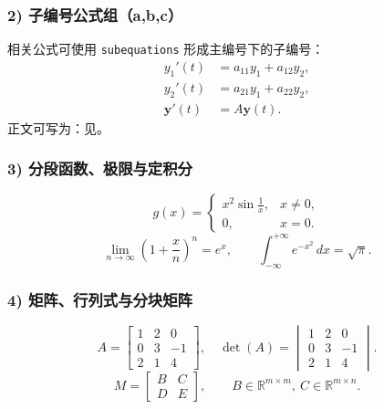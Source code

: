 \subsubsection*{2) 子编号公式组（a,b,c）}
相关公式可使用 \verb|subequations| 形成主编号下的子编号：
\begin{subequations}\label{eq:usage-ode}
  \begin{align}
    y_1'(t) &= a_{11}y_1+a_{12}y_2, \label{eq:usage-ode-a}\\
    y_2'(t) &= a_{21}y_1+a_{22}y_2, \label{eq:usage-ode-b}\\
    \bm{y}'(t) &= A\bm{y}(t). \label{eq:usage-ode-c}
  \end{align}
\end{subequations}
正文可写为：见。

\subsubsection*{3) 分段函数、极限与定积分}
\begin{equation}\label{eq:usage-cases}
  g(x)=
  \begin{cases}
    x^2\sin\frac{1}{x}, & x\neq 0,\\
    0, & x=0.
  \end{cases}
\end{equation}
\begin{equation}\label{eq:usage-limit}
  \lim_{n\to\infty}\left(1+\frac{x}{n}\right)^n = e^x,\qquad
  \int_{-\infty}^{+\infty} e^{-x^2}\,dx=\sqrt{\pi}.
\end{equation}

\subsubsection*{4) 矩阵、行列式与分块矩阵}
\begin{equation}\label{eq:usage-matrix}
  A=
  \begin{bmatrix}
    1 & 2 & 0\\
    0 & 3 & -1\\
    2 & 1 & 4
  \end{bmatrix},\quad
  \det(A)=
  \begin{vmatrix}
    1 & 2 & 0\\
    0 & 3 & -1\\
    2 & 1 & 4
  \end{vmatrix}.
\end{equation}
\begin{equation}\label{eq:usage-block}
  M=
  \begin{bmatrix}
    B & C\\
    D & E
  \end{bmatrix},\qquad
  B\in\mathbb{R}^{m\times m},\ C\in\mathbb{R}^{m\times n}.
\end{equation}


